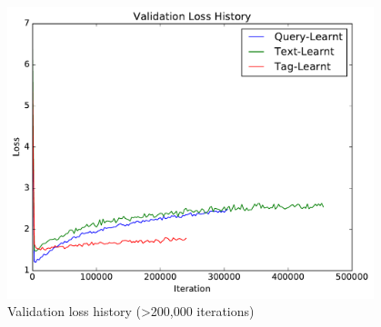 \begin{figure}[h]
    \centering
    \includegraphics[width=0.95\textwidth]{graphs/validation-loss-history}
    \caption{Validation loss history (\textgreater 200,000 iterations)}
    \label{fig:val-loss-2}
\end{figure}
